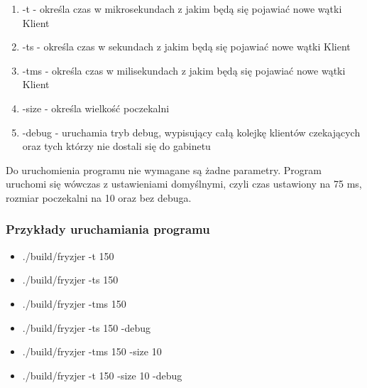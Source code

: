 \documentclass[12pt,a4paper]{article}
\begin{document}
	\begin{enumerate}[label=\alph*)]
		\item -t  - określa czas w mikrosekundach z jakim będą się pojawiać 
				nowe wątki Klient
		\item -ts - określa czas w sekundach z jakim będą się pojawiać 
				nowe wątki Klient
		\item -tms - określa czas w milisekundach z jakim będą się pojawiać 
				nowe wątki Klient
		\item -size - określa wielkość poczekalni
		\item -debug - uruchamia tryb debug, wypisujący całą kolejkę klientów 
				czekających oraz tych którzy nie dostali się do gabinetu 
	\end{enumerate}
	Do uruchomienia programu nie wymagane są żadne parametry. Program uruchomi 
	się wówczas z ustawieniami domyślnymi, czyli czas ustawiony na 75 ms, rozmiar 
	poczekalni na 10 oraz bez debuga.
	\subsubsection*{Przykłady uruchamiania programu}
	\begin{itemize}
		\item ./build/fryzjer -t   150
		\item ./build/fryzjer -ts  150
		\item ./build/fryzjer -tms 150
		\item ./build/fryzjer -ts  150 -debug
		\item ./build/fryzjer -tms 150 -size 10
		\item ./build/fryzjer -t   150 -size 10 -debug
	\end{itemize}
 




	
\end{document}
